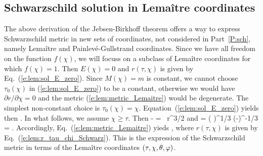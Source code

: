 \subsection{Schwarzschild solution in Lemaître coordinates} \label{s:lem:Schwarzschild}

The above derivation of the Jebsen-Birkhoff theorem offers a way to express
Schwarzschild metric in new sets of coordinates, not considered in Part~\ref{P:sch},
namely Lemaître and Painlevé-Gullstrand coordinates.
Since we have all freedom on the function $f(\chi)$, we will focuss on a subclass
of Lemaître coordinates for which $f(\chi)=1$.
Then $E(\chi)=0$ and $r(\tau,\chi)$
is given by Eq.~(\ref{e:lem:sol_E_zero}). Since $M(\chi)=m$ is constant, we
cannot choose $\tau_0(\chi)$ in (\ref{e:lem:sol_E_zero}) to be a constant, otherwise we would have
$\partial r/\partial \chi=0$ and the metric
(\ref{e:lem:metric_Lemaitre}) would be degenerate.
The simplest non-constant choice is
$\tau_0(\chi) = \chi$.
Equation~(\ref{e:lem:sol_E_zero}) yields then
\be \label{e:lem:r_tau_chi_Schwarz}
    .
\ee
In what follows, we assume $\chi\geq\tau$. Then
\be \label{e:lem:chi_tau_r_Schwarz}
    \chi - \tau =  \,  r^{3/2}
\ee
and
\be \label{e:lem:drdchi_Schwarz}
     = \left(  \right)^{1/3} (\chi-\tau)^{-1/3}
        =  .
\ee
Accordingly, Eq.~(\ref{e:lem:metric_Lemaitre}) yieds
\be \label{e:lem:Sch_met_Lem}
     ,
\ee
where $r(\tau,\chi)$ is given by Eq.~(\ref{e:lem:r_tau_chi_Schwarz}).
This is the expression of the Schwarzschild metric in terms of the
Lemaître coordinates $(\tau,\chi,\theta,\varphi)$.

